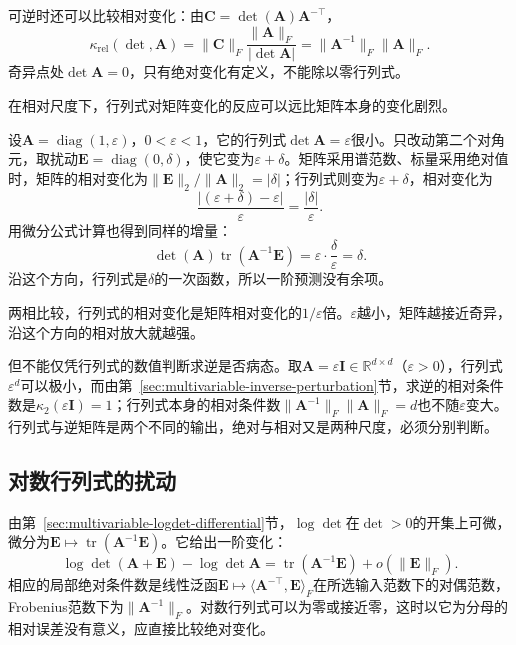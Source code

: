可逆时还可以比较相对变化：由$\bm C=\det(\bm A)\bm A^{-\top}$，
\[
 \kappa_{\mathrm{rel}}(\det,\bm A)=\lVert\bm C\rVert_F\frac{\lVert\bm A\rVert_F}{|\det\bm A|}=\lVert\bm A^{-1}\rVert_F\lVert\bm A\rVert_F .
\]
奇异点处$\det\bm A=0$，只有绝对变化有定义，不能除以零行列式。

在相对尺度下，行列式对矩阵变化的反应可以远比矩阵本身的变化剧烈。
\begin{example}[接近奇异时的行列式]
\label{ex:ls-determinant-near-singular}
设$\bm A=\operatorname{diag}(1,\varepsilon)$，$0<\varepsilon<1$，它的行列式$\det\bm A=\varepsilon$很小。只改动第二个对角元，取扰动$\bm E=\operatorname{diag}(0,\delta)$，使它变为$\varepsilon+\delta$。矩阵采用谱范数、标量采用绝对值时，矩阵的相对变化为$\lVert\bm E\rVert_2/\lVert\bm A\rVert_2=|\delta|$；行列式则变为$\varepsilon+\delta$，相对变化为
\[
 \frac{|(\varepsilon+\delta)-\varepsilon|}{\varepsilon}=\frac{|\delta|}{\varepsilon}.
\]
用微分公式计算也得到同样的增量：
\[
 \det(\bm A)\operatorname{tr}(\bm A^{-1}\bm E)=\varepsilon\cdot\frac\delta\varepsilon=\delta .
\]
沿这个方向，行列式是$\delta$的一次函数，所以一阶预测没有余项。

两相比较，行列式的相对变化是矩阵相对变化的$1/\varepsilon$倍。$\varepsilon$越小，矩阵越接近奇异，沿这个方向的相对放大就越强。
\end{example}

但不能仅凭行列式的数值判断求逆是否病态。取$\bm A=\varepsilon\bm I\in\mathbb R^{d\times d}$（$\varepsilon>0$），行列式$\varepsilon^d$可以极小，而由第~\ref{sec:multivariable-inverse-perturbation}节，求逆的相对条件数是$\kappa_2(\varepsilon\bm I)=1$；行列式本身的相对条件数$\lVert\bm A^{-1}\rVert_F\lVert\bm A\rVert_F=d$也不随$\varepsilon$变大。行列式与逆矩阵是两个不同的输出，绝对与相对又是两种尺度，必须分别判断。

\subsection{对数行列式的扰动}
\label{sec:multivariable-logdet-perturbation}

由第~\ref{sec:multivariable-logdet-differential}节，$\log\det$在$\det>0$的开集上可微，微分为$\bm E\mapsto\operatorname{tr}(\bm A^{-1}\bm E)$。它给出一阶变化：
\[
 \log\det(\bm A+\bm E)-\log\det\bm A
 =\operatorname{tr}(\bm A^{-1}\bm E)+o(\lVert\bm E\rVert_F).
\]
相应的局部绝对条件数是线性泛函$\bm E\mapsto\langle\bm A^{-\top},\bm E\rangle_F$在所选输入范数下的对偶范数，Frobenius范数下为$\lVert\bm A^{-1}\rVert_F$。对数行列式可以为零或接近零，这时以它为分母的相对误差没有意义，应直接比较绝对变化。

